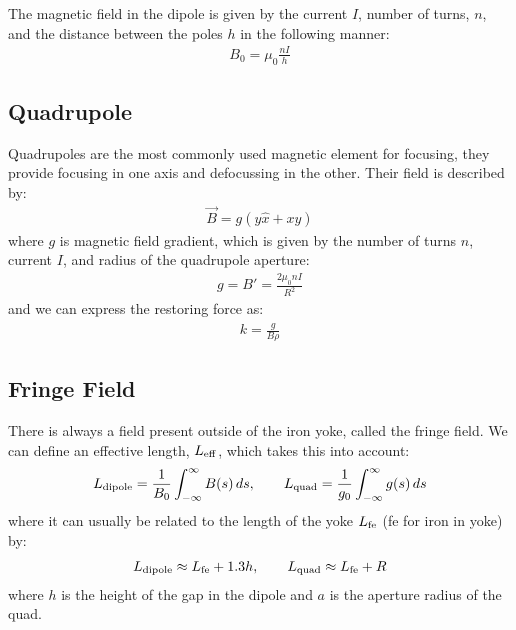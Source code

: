 \documentclass{article}
\numberwithin{equation}{section}
\begin{document}
The magnetic field in the dipole is given by the current $I$, number of turns, $n$, and the distance between the poles $h$ in the following manner:
\begin{align}
B_0 = \mu_0 \frac{nI}{h}
\end{align}

\subsection{Quadrupole}

Quadrupoles are the most commonly used magnetic element for focusing, they provide focusing in one axis and defocussing in the other. Their field is described by:
\begin{align}
\vec{B} = g (y \hat{x} + x \hat{y})
\end{align}
where $g$ is magnetic field gradient, which is given by the number of turns $n$, current $I$, and radius of the quadrupole aperture:
\begin{align}
g = B' = \frac{2 \mu_0 n I}{R^2}
\end{align}
and we can express the restoring force as:
\begin{align}
k = \frac{g}{B\rho}
\end{align}

\subsection{Fringe Field}

There is always a field present outside of the iron yoke, called the fringe field. We can define an effective length, $L_{\rm eff}$, which takes this into account:
\begin{align}
L_{\rm dipole} = \frac{1}{B_0} \int_{-\infty}^{\infty} B(s) \, ds ,\qquad
L_{\rm quad} = \frac{1}{g_0} \int_{-\infty}^{\infty} g(s) \, ds
\end{align}
where it can usually be related to the length of the yoke $L_{\rm fe}$ (fe for iron in yoke) by:
\begin{align}
L_{\rm dipole} \approx L_{\rm fe} + 1.3 h ,\qquad
L_{\rm quad} \approx L_{\rm fe} + R
\end{align}
where $h$ is the height of the gap in the dipole and $a$ is the aperture radius of the quad.
\end{document}
